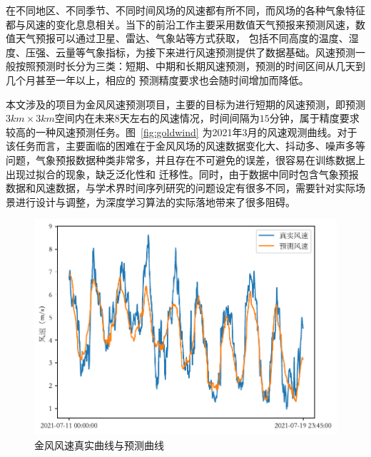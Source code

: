 在不同地区、不同季节、不同时间风场的风速都有所不同，而风场的各种气象特征都与风速的变化息息相关。当下的前沿工作主要采用数值天气预报来预测风速，数值天气预报可以通过卫星、雷达、气象站等方式获取，
包括不同高度的温度、湿度、压强、云量等气象指标，为接下来进行风速预测提供了数据基础。风速预测一般按照预测时长分为三类：短期、中期和长期风速预测，预测的时间区间从几天到几个月甚至一年以上，相应的
预测精度要求也会随时间增加而降低。

本文涉及的项目为金风风速预测项目，主要的目标为进行短期的风速预测，即预测$3km\times3km$空间内在未来$8$天左右的风速情况，时间间隔为$15$分钟，属于精度要求较高的一种风速预测任务。图~\ref{fig:goldwind}
为2021年3月的风速观测曲线。对于该任务而言，主要面临的困难在于金风风场的风速数据变化大、抖动多、噪声多等问题，气象预报数据种类非常多，并且存在不可避免的误差，很容易在训练数据上出现过拟合的现象，缺乏泛化性和
迁移性。同时，由于数据中同时包含气象预报数据和风速数据，与学术界时间序列研究的问题设定有很多不同，需要针对实际场景进行设计与调整，为深度学习算法的实际落地带来了很多阻碍。

\begin{figure}
  \centering
  \includegraphics[width=0.75\linewidth]{figures/wind2.pdf}
  \caption{金风风速真实曲线与预测曲线}
  \label{fig:pred}
\end{figure}

